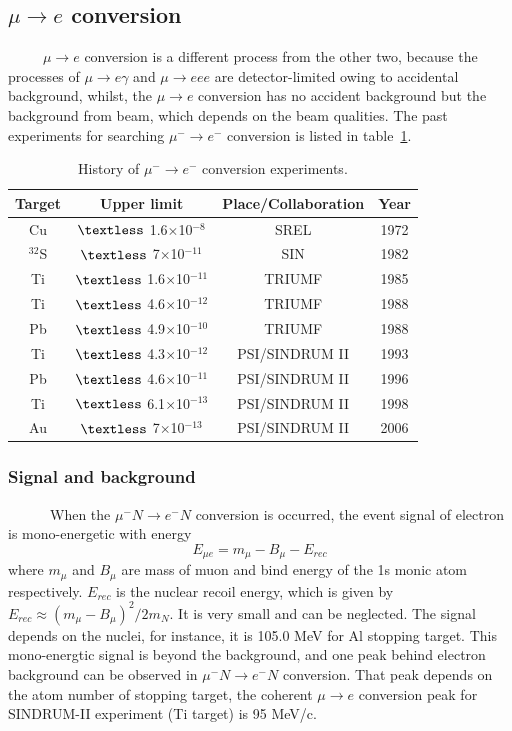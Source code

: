 \subsection{$\mu \rightarrow e$ conversion}
~~~~~$\mu \rightarrow e$ conversion is a different process from the other two, because the processes of $\mu \rightarrow e\gamma$ and $\mu \rightarrow eee$ are detector-limited owing to accidental background, whilst, the $\mu \rightarrow e$ conversion has no accident background but the background from beam, which depends on the beam qualities.
The past experiments for searching $\mu^- \rightarrow e^-$ conversion is listed in table~\ref{muehis}.
\begin{table}[H]
 \centering
 \begin{tabular}{cccc} \hline \hline
  Target & Upper limit & Place/Collaboration & Year \\ \hline
  Cu & $\textless$ 1.6$\times$10$^{-8}$ & SREL & 1972 \\
  $^{32}$S & $\textless$ 7$\times$10$^{-11}$ & SIN & 1982 \\
  Ti & $\textless$ 1.6$\times$10$^{-11}$ & TRIUMF & 1985 \\
  Ti & $\textless$ 4.6$\times$10$^{-12}$ & TRIUMF & 1988 \\
  Pb & $\textless$ 4.9$\times$10$^{-10}$ & TRIUMF & 1988 \\
  Ti & $\textless$ 4.3$\times$10$^{-12}$ & PSI/SINDRUM II & 1993 \\
  Pb & $\textless$ 4.6$\times$10$^{-11}$ & PSI/SINDRUM II & 1996 \\
  Ti & $\textless$ 6.1$\times$10$^{-13}$ & PSI/SINDRUM II & 1998 \\
  Au & $\textless$ 7$\times$10$^{-13}$ & PSI/SINDRUM II & 2006 \\ \hline \hline
 \end{tabular}
 \caption{History of $\mu^- \rightarrow e^-$ conversion experiments.}
 \label{muehis}
\end{table}

\subsubsection{Signal and background}
~~~~~~When the $\mu^-N \rightarrow e^-N$ conversion is occurred, the event signal of electron is mono-energetic with energy
\begin{equation}
 E_{\mu e} = m_\mu - B_\mu - E_{rec}
\end{equation}
where $m_\mu$ and $B_\mu$ are mass of muon and bind energy of the 1s monic atom respectively.
$E_{rec}$ is the nuclear recoil energy, which is given by $E_{rec} \approx (m_\mu - B_\mu)^2/2m_N$.
It is very small and can be neglected.
The signal depends on the nuclei, for instance, it is 105.0 MeV for Al stopping target.
This mono-energtic signal is beyond the background, and one peak behind electron background can be observed in $\mu^-N \rightarrow e^-N$ conversion.
That peak depends on the atom number of stopping target, the coherent $\mu \rightarrow e$ conversion peak for SINDRUM-II experiment (Ti target) is 95 MeV/c.

